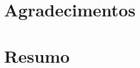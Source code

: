 \documentclass[
  12pt,
  a4paper,
]{scrreprt}
\renewcommand*\listfigurename{Lista de Figuras}
\newcommand\listfigurename{Lista de Figuras}
\renewcommand*\listtablename{Lista de Tabelas}
\newcommand\listtablename{Lista de Tabelas}
\begin{document}
\fancyhf{}
\fancyhead[RO, LE]{\thepage}
\fancyhead[LO]{\leftmark}
\fancyhead[RE]{\thepage}


\thispagestyle{empty}

\newpage

\bgroup
\hypersetup{linkcolor = black}

\cleardoublepage
\renewcommand{\listfigurename}{\centering{Lista de Figuras}}
\listoffigures
\thispagestyle{empty}

\cleardoublepage
\renewcommand{\listtablename}{\centering{Lista de Tabelas}}
\listoftables
\thispagestyle{empty}

\cleardoublepage
\renewcommand{\listalgorithmname}{\centering{Lista de Algoritmos}}
\listofalgorithms
\thispagestyle{empty}

\egroup

\chapter*{\centering Agradecimentos}
\thispagestyle{empty}

\chapter*{\centering Resumo}
\thispagestyle{empty}
\end{document}
